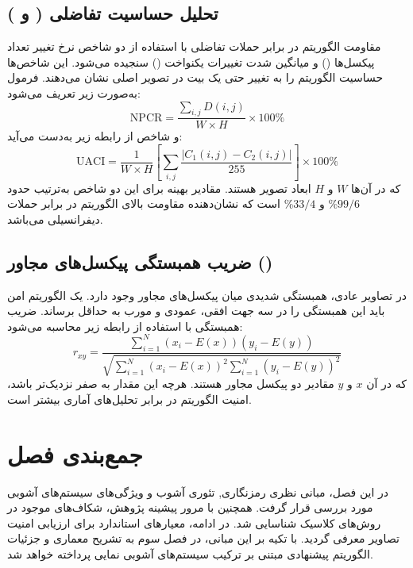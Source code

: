 \subsection{تحلیل حساسیت تفاضلی (\protect{} و \protect{})}
مقاومت الگوریتم در برابر حملات تفاضلی\protect{} با استفاده از دو شاخص نرخ تغییر تعداد پیکسل‌ها () و میانگین شدت تغییرات یکنواخت () سنجیده می‌شود. این شاخص‌ها حساسیت الگوریتم را به تغییر حتی یک بیت در تصویر اصلی نشان می‌دهند.
فرمول  به‌صورت زیر تعریف می‌شود:
\begin{equation} \label{eq:npcr_def}
\mathrm{NPCR} = \frac{\sum_{i,j} D(i,j)}{W \times H} \times 100\text{\%}
\end{equation}
و شاخص  از رابطه زیر به‌دست می‌آید:
\begin{equation} \label{eq:uaci_def}
\mathrm{UACI} = \frac{1}{W \times H} \left[ \sum_{i,j} \frac{|C_1(i,j) - C_2(i,j)|}{255} \right] \times 100\text{\%}
\end{equation}
که در آن‌ها $W$ و $H$ ابعاد تصویر هستند. مقادیر بهینه برای این دو شاخص به‌ترتیب حدود $99/6$\% و $33/4$\% است که نشان‌دهنده مقاومت بالای الگوریتم در برابر حملات دیفرانسیلی می‌باشد\cite{ref3}.

\subsection{ضریب همبستگی پیکسل‌های مجاور ()}
در تصاویر عادی، همبستگی شدیدی میان پیکسل‌های مجاور وجود دارد. یک الگوریتم امن باید این همبستگی را در سه جهت افقی، عمودی و مورب به حداقل برساند. ضریب همبستگی با استفاده از رابطه زیر محاسبه می‌شود:
\begin{equation} \label{eq:correlation_def}
r_{xy} = \frac{\sum_{i=1}^N (x_i - E(x))(y_i - E(y))}{\sqrt{\sum_{i=1}^N (x_i - E(x))^2 \sum_{i=1}^N (y_i - E(y))^2}}
\end{equation}
که در آن $x$ و $y$ مقادیر دو پیکسل مجاور هستند. هرچه این مقدار به صفر نزدیک‌تر باشد، امنیت الگوریتم در برابر تحلیل‌های آماری بیشتر است\cite{ref10}.

\section{جمع‌بندی فصل}
در این فصل، مبانی نظری رمزنگاری, تئوری آشوب و ویژگی‌های سیستم‌های آشوبی مورد بررسی قرار گرفت. همچنین با مرور پیشینه پژوهش، شکاف‌های موجود در روش‌های کلاسیک شناسایی شد. در ادامه، معیارهای استاندارد برای ارزیابی امنیت تصاویر معرفی گردید. با تکیه بر این مبانی، در فصل سوم به تشریح معماری و جزئیات الگوریتم پیشنهادی مبتنی بر ترکیب سیستم‌های آشوبی نمایی پرداخته خواهد شد.

